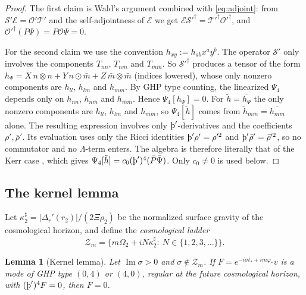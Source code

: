 \documentclass[11pt]{amsart}
\newtheorem{lemma}[theorem]{Lemma}
\theoremstyle{definition}
\theoremstyle{remark}
\numberwithin{equation}{section}
\newcommand{\Th}{\text{\th}}
\renewcommand{\Im}{\operatorname{Im}}
\begin{document}
\begin{proof}
The first claim is Wald's argument combined with \eqref{eq:adjoint}: from $\mathcal S'\mathcal E=\mathcal O'\mathcal T'$ and
the self-adjointness of $\mathcal E$ we get $\mathcal E\mathcal S'^\dagger=\mathcal T'^\dagger\mathcal O'^\dagger$, and
$\mathcal O'^\dagger(P\Psi)=P\mathcal O\Psi=0$.

For the second claim we use the convention $h_{xy}:=h_{ab}x^ay^b$. The operator $\mathcal S'$ only involves the
components $T_{nn}$, $T_{n\bar m}$ and $T_{\bar m\bar m}$. So $\mathcal S'^\dagger$ produces a tensor of the form
$h_\Psi=X\,n\otimes n+Y\,n\odot\bar m+Z\,\bar m\otimes\bar m$ (indices lowered), whose only nonzero components are
$h_{ll}$, $h_{lm}$ and $h_{mm}$. By GHP
type counting, the linearized $\Psi_4$ depends only on $h_{nn}$, $h_{n\bar m}$ and $h_{\bar m\bar m}$. Hence
$\Psi_4[h_\Psi]=0$. For $\tilde h=\overline{h_\Psi}$ the only nonzero components are $h_{ll}$, $h_{l\bar m}$ and
$h_{\bar m\bar m}$, so $\Psi_4[\tilde h]$ comes from $\tilde h_{\bar m\bar m}=\overline{h_{mm}}$ alone. The resulting expression involves only $\Th'$-derivatives and the coefficients $\rho',\bar\rho'$. Its evaluation
uses only the Ricci identities $\Th'\rho'=\rho'^2$ and $\Th'\bar\rho'=\bar\rho'^2$, so no commutator and no
$\Lambda$-term enters. The algebra is therefore literally that of the Kerr case \cite{Wal78,KSFK03}, which gives
$\Psi_4[\tilde h]=c_0(\Th')^4(\bar P\bar\Psi)$. Only $c_0\ne0$ is used below.
\end{proof}

\subsection{The kernel lemma}
Let $\kappa_2^\sharp=|\Delta_r'(r_2)|/(2\Xi\rho_2)$ be the normalized surface gravity of the cosmological horizon,
and define the \emph{cosmological ladder}
\[
\mathcal Z_m=\big\{m\Omega_2+iN\kappa_2^\sharp:\ N\in\{1,2,3,\dots\}\big\}.
\]

\begin{lemma}[Kernel lemma]\label{lem:kernel}
Let $\Im\sigma>0$ and $\sigma\notin\mathcal Z_m$. If $F=e^{-i\sigma t_*+im\varphi_*}v$ is a mode of GHP type
$(0,4)$ or $(4,0)$, regular at the future cosmological horizon, with $(\Th')^4F=0$, then $F=0$.
\end{lemma}
\end{document}
